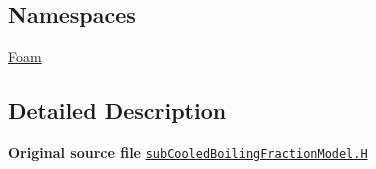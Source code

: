 \subsection*{Namespaces}
\begin{DoxyCompactItemize}
\item 
 \hyperlink{namespaceFoam}{Foam}
\end{DoxyCompactItemize}


\subsection{Detailed Description}
{\bfseries Original source file} \href{../../../home/carlo/data/GeN-Foam/GeN-Foam_ffn/GeN-Foam/GeN-Foam/classes/thermalHydraulics/src/physicsModels/heatTransferModels/FSHeatTransferCoefficientModels/subModels/subCooledBoilingFractionModels/subCooledBoilingFractionModel.H}{\tt sub\+Cooled\+Boiling\+Fraction\+Model.\+H} 